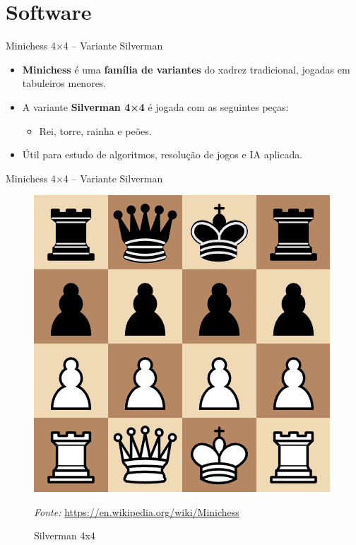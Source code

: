 \documentclass{beamer}
\begin{document}
\section{Software}


\begin{frame}{Minichess 4×4 – Variante Silverman}
\begin{itemize}
  \item \textbf{Minichess} é uma \textbf{família de variantes} do xadrez tradicional, jogadas em tabuleiros menores.
  \item A variante \textbf{Silverman 4×4} é jogada com as seguintes peças:
  \begin{itemize}
    \item Rei, torre, rainha e peões.
  \end{itemize}
  \item Útil para estudo de algoritmos, resolução de jogos e IA aplicada.
\end{itemize}
\end{frame}


\begin{frame}{Minichess 4×4 – Variante Silverman}
  \begin{figure}
    \centering
    \includegraphics[width=0.5\linewidth]{images/Minichess4x4.png}
    \caption{Silverman 4x4}
      \vspace{0.3em}
  {\small \textit{Fonte:} \href{https://en.wikipedia.org/wiki/Minichess}{https://en.wikipedia.org/wiki/Minichess}}
    \label{fig:enter-label}
\end{figure}
\end{frame}
\end{document}
